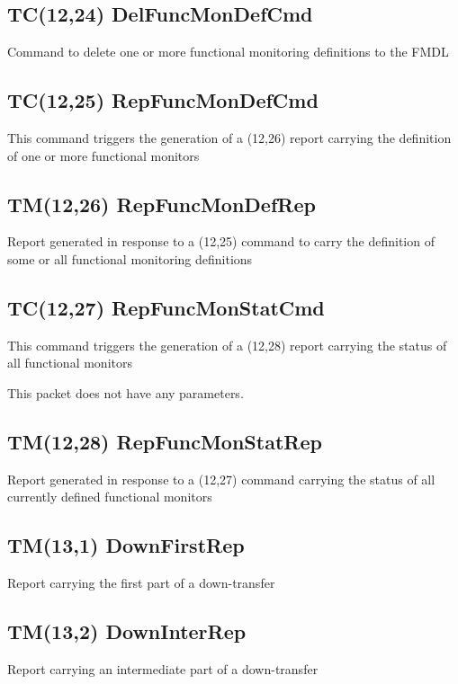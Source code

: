 \pagebreak
\subsection{TC(12,24) DelFuncMonDefCmd}
Command to delete one or more functional monitoring definitions to the FMDL

\pagebreak
\subsection{TC(12,25) RepFuncMonDefCmd}
This command triggers the generation of a (12,26) report carrying the definition of one or more functional monitors

\pagebreak
\subsection{TM(12,26) RepFuncMonDefRep}
Report generated in response to a (12,25) command to carry the definition of some or all functional monitoring definitions

\pagebreak
\subsection{TC(12,27) RepFuncMonStatCmd}
This command triggers the generation of a (12,28) report carrying the status of all functional monitors

This packet does not have any parameters.

\pagebreak
\subsection{TM(12,28) RepFuncMonStatRep}
Report generated in response to a (12,27) command carrying the status of all currently defined functional monitors

\pagebreak
\subsection{TM(13,1) DownFirstRep}
Report carrying the first part of a down-transfer

\pagebreak
\subsection{TM(13,2) DownInterRep}
Report carrying an intermediate part of a down-transfer


